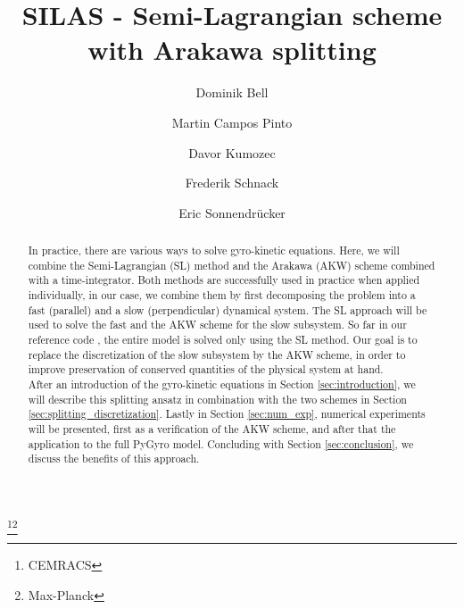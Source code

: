 \documentclass[proc]{edpsmath}
\begin{document}
\title{SILAS - Semi-Lagrangian scheme with Arakawa splitting}
\thanks{CEMRACS}\thanks{Max-Planck}%

\author{Dominik Bell}\address{Max-Planck-Institut für Plasmaphysik, Garching, Germany; }
\author{Martin Campos Pinto}
\author{Davor Kumozec}\address{Faculty of Sciences, University of Novi Sad, Serbia; }
\author{Frederik Schnack}
\author{Eric Sonnendrücker}


\begin{abstract}
In practice, there are various ways to solve gyro-kinetic equations. Here, we will combine the Semi-Lagrangian (SL) method and the Arakawa (AKW) scheme combined with a time-integrator. Both methods are successfully used in practice when applied individually, in our case, we combine them by first decomposing the problem into a fast (parallel) and a slow (perpendicular) dynamical system. The SL approach will be used to solve the fast and the AKW scheme for the slow subsystem. So far in our reference code \cite{pygyro_code}, the entire model is solved only using the SL method. Our goal is to replace the discretization of the slow subsystem by the AKW scheme, in order to improve preservation of conserved quantities of the physical system at hand. \\
After an introduction of the gyro-kinetic equations in Section \ref{sec:introduction}, we will describe this splitting ansatz in combination with the two schemes in Section \ref{sec:splitting_discretization}. Lastly in Section \ref{sec:num_exp}, numerical experiments will be presented, first as a verification of the AKW scheme, and after that the application to the full PyGyro model. Concluding with Section \ref{sec:conclusion}, we discuss the benefits of this approach. 
\end{abstract}
\end{document}
